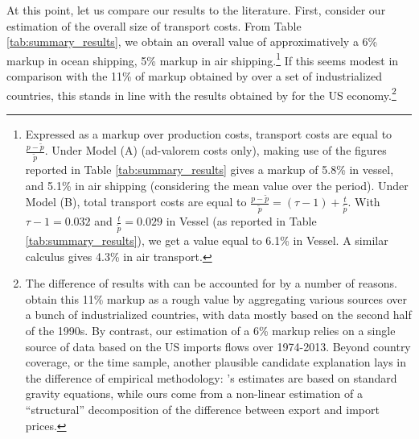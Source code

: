 \documentclass[a4paper,11pt]{article}
\begin{document}
At this point, let us compare our results to the literature. First, consider our estimation of the overall size of transport costs. From Table \ref{tab:summary_results}, we obtain an overall value of approximatively a 6\% markup in ocean shipping, 5\% markup in air shipping.\footnote{Expressed as a markup over production costs, transport costs are equal to $\frac{p-\widetilde{p}}{\widetilde{p}}$. Under Model (A) (ad-valorem costs only), making use of the figures reported in Table \ref{tab:summary_results} gives a markup of 5.8\% in vessel, and 5.1\% in air shipping (considering the mean value over the period). Under Model (B), total transport costs are equal to $\frac{p-\widetilde{p}}{\widetilde{p}} = (\tau-1) + \frac{t}{\widetilde{p}}$. With $\tau-1= 0.032$ and $\frac{t}{\widetilde{p}}= 0.029$ in Vessel (as reported in Table \ref{tab:summary_results}), we get a value equal to 6.1\% in Vessel. A similar calculus gives 4.3\% in air transport.} If this seems modest in comparison with the 11\% of markup obtained by \citet{anderson_wincoop_jel} over a set of industrialized countries, this stands in line with the results obtained by \citet{hummels2007} for the US economy.\footnote{The difference of results with \citet{anderson_wincoop_jel} can be accounted for by a number of reasons. \citet{anderson_wincoop_jel} obtain this 11\% markup as a rough value by aggregating various sources over a bunch of industrialized countries, with data mostly based on the second half of the 1990s. By contrast, our estimation of a 6\% markup relies on a single source of data based on the US imports flows over 1974-2013. Beyond country coverage, or the time sample, another plausible candidate explanation lays in the difference of empirical methodology: \citet{anderson_wincoop_jel}'s estimates are based on standard gravity equations, while ours come from a non-linear estimation of a ``structural'' decomposition of the difference between export and import prices.}
\end{document}
